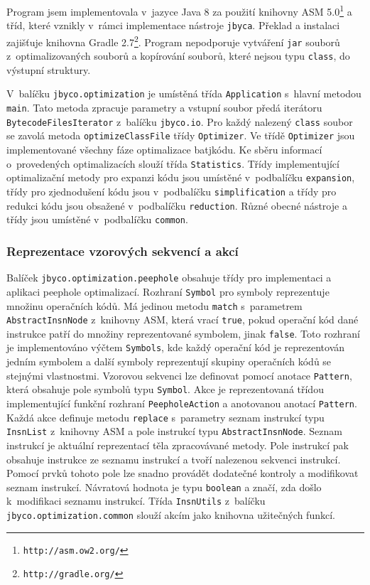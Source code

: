Program jsem implementovala v~jazyce Java 8 za použití knihovny ASM 5.0\footnote{\texttt{http://asm.ow2.org/}} a tříd, které vznikly v~rámci implementace nástroje \texttt{jbyca}. Překlad a instalaci zajišťuje knihovna Gradle 2.7\footnote{\texttt{http://gradle.org/}}. Program nepodporuje vytváření \texttt{jar} souborů z~optimalizovaných souborů a kopírování souborů, které nejsou typu \texttt{class}, do výstupní struktury.

V~balíčku \texttt{jbyco.optimization} je umístěná třída \texttt{Application} s~hlavní metodou \texttt{main}. Tato metoda zpracuje parametry a vstupní soubor předá iterátoru \texttt{BytecodeFilesIterator} z~balíčku \texttt{jbyco.io}. Pro každý nalezený \texttt{class} soubor se zavolá metoda \texttt{optimizeClassFile} třídy \texttt{Optimizer}. Ve třídě \texttt{Optimizer} jsou implementované všechny fáze optimalizace batjkódu. Ke sběru informací o~provedených optimalizacích slouží třída \texttt{Statistics}. Třídy implementující optimalizační metody pro expanzi kódu jsou umístěné v~podbalíčku \texttt{expansion}, třídy pro zjednodušení kódu jsou v~podbalíčku \texttt{simplification} a třídy pro redukci kódu jsou obsažené v~podbalíčku \texttt{reduction}. Různé obecné nástroje a třídy jsou umístěné v~podbalíčku \texttt{common}. 

\subsubsection{Reprezentace vzorových sekvencí a akcí}

Balíček \texttt{jbyco.optimization.peephole} obsahuje třídy pro implementaci a aplikaci peephole optimalizací. Rozhraní \texttt{Symbol} pro symboly reprezentuje množinu operačních kódů. Má jedinou metodu \texttt{match} s~parametrem \texttt{AbstractInsnNode} z~knihovny ASM, která vrací \texttt{true}, pokud operační kód dané instrukce patří do množiny reprezentované symbolem, jinak \texttt{false}. Toto rozhraní je implementováno výčtem \texttt{Symbols}, kde každý operační kód je reprezentován jedním symbolem a další symboly reprezentují skupiny operačních kódů se stejnými vlastnostmi. Vzorovou sekvenci lze definovat pomocí anotace \texttt{Pattern}, která obsahuje pole symbolů typu \texttt{Symbol}. Akce je reprezentovaná třídou implementující funkční rozhraní \texttt{PeepholeAction} a anotovanou anotací \texttt{Pattern}. Každá akce definuje metodu \texttt{replace} s~parametry seznam instrukcí typu \texttt{InsnList} z~knihovny ASM a pole instrukcí typu \texttt{AbstractInsnNode}. Seznam instrukcí je aktuální reprezentací těla zpracovávané metody. Pole instrukcí pak obsahuje instrukce ze seznamu instrukcí a tvoří nalezenou sekvenci instrukcí. Pomocí prvků tohoto pole lze snadno provádět dodatečné kontroly a modifikovat seznam instrukcí. Návratová hodnota je typu \texttt{boolean} a značí, zda došlo k~modifikaci seznamu instrukcí. Třída \texttt{InsnUtils} z~balíčku \texttt{jbyco.optimization.common} slouží akcím jako knihovna užitečných funkcí.

